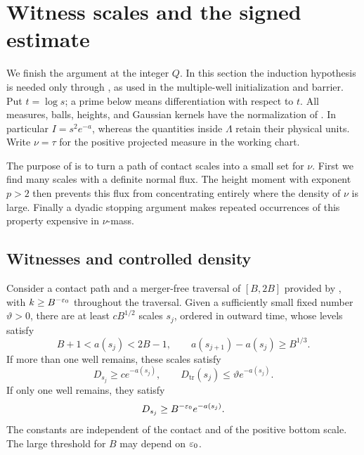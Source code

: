 \section{Witness scales and the signed estimate}
\label{sec:packing}

We finish the argument at the integer $Q$.  In this section the induction
hypothesis is needed only through , as used in the
multiple-well initialization and barrier. Put $t=\log s$; a prime
below means differentiation with respect to $t$.  All measures, balls,
heights, and Gaussian kernels have the normalization of
.  In particular $I=s^2e^{-a}$, whereas the quantities
inside $\Lambda$ retain their physical units.  Write $\nu=\tau$ for the
positive projected measure in the working chart.

The purpose of  is to turn a path of contact scales
into a small set for $\nu$.  First we find many scales with a definite
normal flux.  The height moment with exponent $p>2$ then prevents this
flux from concentrating entirely where the density of $\nu$ is large.
Finally a dyadic stopping argument makes repeated occurrences of this
property expensive in $\nu$-mass.

\subsection{Witnesses and controlled density}

\begin{lemma}\label{pk:witnesses}
Consider a contact path and a merger-free traversal of $[B,2B]$
provided by , with $k\ge B^{-\varepsilon_0}$ throughout the
traversal.  Given a sufficiently small fixed number $\vartheta>0$,
there are at least $cB^{1/2}$ scales $s_j$, ordered in outward time,
whose levels satisfy
\begin{equation}\label{pk:level-spacing}
 B+1<a(s_j)<2B-1,\qquad
 a(s_{j+1})-a(s_j)\ge B^{1/3}.
\end{equation}
If more than one well remains, these scales satisfy
\begin{equation}\label{pk:multi-witness}
 D_{s_j}\ge c e^{-a(s_j)},\qquad
 D_{\mathrm{tr}}(s_j)\le\vartheta e^{-a(s_j)}.
\end{equation}
If only one well remains, they satisfy
\begin{equation}\label{pk:single-witness}
 D_{s_j}\ge B^{-\varepsilon_0}e^{-a(s_j)}.
\end{equation}
The constants are independent of the contact and of the positive
bottom scale.  The large threshold for $B$ may depend on $\varepsilon_0$.
\end{lemma}


